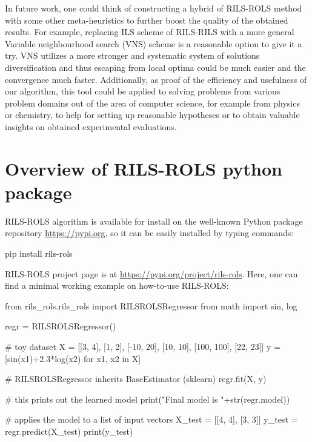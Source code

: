 \documentclass[a4paper,12pt]{elsarticle}
\begin{document}
In future work, one could think of constructing a hybrid of \textsc{RILS-ROLS} method with some other meta-heuristics to further boost the quality of the obtained results. For example, replacing ILS scheme of \textsc{RILS-RILS} with a more general Variable neighbourhood search (VNS) scheme is a reasonable option to give it a try. VNS   utilizes a more stronger and systematic system of solutions diversification and thus escaping from local optima could be much easier and the convergence much faster.  Additionally, as proof of the efficiency and usefulness of our algorithm, this tool could be applied to solving problems from various problem domains out of the area of computer science, for example from physics or chemistry, to help for setting up reasonable hypotheses or to obtain valuable insights on obtained experimental evaluations.  


\newpage
	
	

\newpage
\appendix

\section{Overview of \textsc{RILS}-\textsc{ROLS} python package}\label{sec:appendix-1}

\textsc{RILS-ROLS} algorithm is available for install on the well-known Python package repository \url{https://pypi.org}, so it can be easily installed by typing commands:
\begin{python} 
	pip install rils-rols
\end{python}
\textsc{RILS-ROLS} project page is at \url{https://pypi.org/project/rils-rols}. Here, one can find a minimal working example on how-to-use \textsc{RILS-ROLS}:

\begin{python}
from rils_rols.rils_rols import RILSROLSRegressor
from math import sin, log

regr = RILSROLSRegressor()

# toy dataset 
X = [[3, 4], [1, 2], [-10, 20], [10, 10], [100, 100], [22, 23]]
y = [sin(x1)+2.3*log(x2) for x1, x2 in X]

# RILSROLSRegressor inherits BaseEstimator (sklearn)
regr.fit(X, y)

# this prints out the learned model
print("Final model is "+str(regr.model))

# applies the model to a list of input vectors
X_test = [[4, 4], [3, 3]]
y_test = regr.predict(X_test)
print(y_test) 
\end{python}
\end{document}
